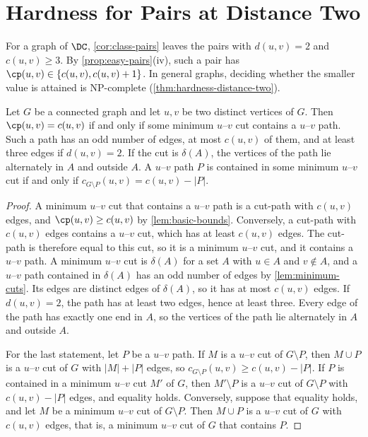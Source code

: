 \section{Hardness for Pairs at Distance Two}
\label{sec:distance-two}

For a graph of $\DC$, \cref{cor:class-pairs} leaves the pairs with $d(u, v) = 2$ and $c(u, v) \geq 3$.
By \cref{prop:easy-pairs}(iv), such a pair has $\cp(u, v) \in \{c(u, v), c(u, v) + 1\}$.
In general graphs, deciding whether the smaller value is attained is NP-complete (\cref{thm:hardness-distance-two}).

\begin{proposition}
\label{prop:open-pairs}
Let $G$ be a connected graph and let $u, v$ be two distinct vertices of $G$.
Then $\cp(u, v) = c(u, v)$ if and only if some minimum $u$--$v$ cut contains a $u$--$v$ path.
Such a path has an odd number of edges, at most $c(u, v)$ of them, and at least three edges if $d(u, v) = 2$.
If the cut is $\delta(A)$, the vertices of the path lie alternately in $A$ and outside $A$.
A $u$--$v$ path $P$ is contained in some minimum $u$--$v$ cut if and only if $c_{G \setminus P}(u, v) = c(u, v) - |P|$.
\end{proposition}

\begin{proof}
A minimum $u$--$v$ cut that contains a $u$--$v$ path is a cut-path with $c(u, v)$ edges, and $\cp(u, v) \geq c(u, v)$ by \cref{lem:basic-bounds}.
Conversely, a cut-path with $c(u, v)$ edges contains a $u$--$v$ cut, which has at least $c(u, v)$ edges.
The cut-path is therefore equal to this cut, so it is a minimum $u$--$v$ cut, and it contains a $u$--$v$ path.
A minimum $u$--$v$ cut is $\delta(A)$ for a set $A$ with $u \in A$ and $v \notin A$, and a $u$--$v$ path contained in $\delta(A)$ has an odd number of edges by \cref{lem:minimum-cuts}.
Its edges are distinct edges of $\delta(A)$, so it has at most $c(u, v)$ edges.
If $d(u, v) = 2$, the path has at least two edges, hence at least three.
Every edge of the path has exactly one end in $A$, so the vertices of the path lie alternately in $A$ and outside $A$.

For the last statement, let $P$ be a $u$--$v$ path.
If $M$ is a $u$--$v$ cut of $G \setminus P$, then $M \cup P$ is a $u$--$v$ cut of $G$ with $|M| + |P|$ edges, so $c_{G \setminus P}(u, v) \geq c(u, v) - |P|$.
If $P$ is contained in a minimum $u$--$v$ cut $M'$ of $G$, then $M' \setminus P$ is a $u$--$v$ cut of $G \setminus P$ with $c(u, v) - |P|$ edges, and equality holds.
Conversely, suppose that equality holds, and let $M$ be a minimum $u$--$v$ cut of $G \setminus P$.
Then $M \cup P$ is a $u$--$v$ cut of $G$ with $c(u, v)$ edges, that is, a minimum $u$--$v$ cut of $G$ that contains $P$.
\end{proof}

